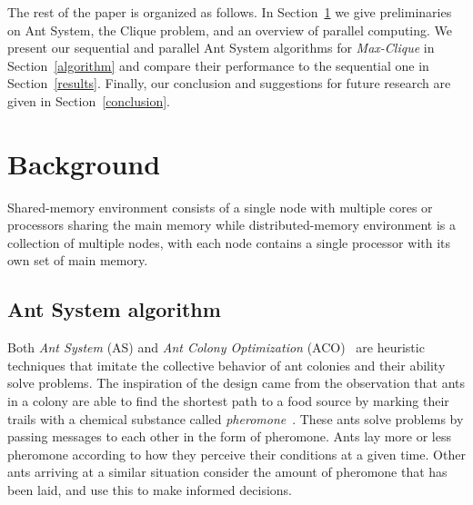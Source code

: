 \documentclass[11pt]{article}
\begin{document}
The rest of the paper is organized as follows. In Section~\ref{background} we give preliminaries on Ant System, the Clique problem, and an overview of parallel computing.  We present our sequential and parallel Ant System algorithms for \textit{Max-Clique} in Section~\ref{algorithm} and compare their performance to the sequential one in Section~\ref{results}.  Finally, our conclusion and suggestions for future research are given in Section~\ref{conclusion}.


\section{Background}\label{background} 

Shared-memory environment consists of a single node with multiple cores or processors sharing 
the main memory 
while distributed-memory environment is a collection of multiple nodes, with each node 
contains a single processor with its own set of main memory. %


\subsection{Ant System algorithm}\label{max_clique} 



Both \textit{Ant System} (AS) and \textit{Ant Colony Optimization} (ACO)~\cite{DD} are heuristic techniques that imitate the collective behavior of ant colonies and their ability solve problems.  The inspiration of the design came from the observation that ants in a colony are able to find the shortest path to a food source by marking their trails with a chemical substance called {\it pheromone}~\cite{BDT, DG}.  These ants solve problems by passing messages to each other in the form of pheromone. Ants lay more or less pheromone according to how they perceive their conditions at a given time. Other ants arriving at a similar situation consider the amount of pheromone that has been laid, and use this to make informed decisions. 

\end{document}
